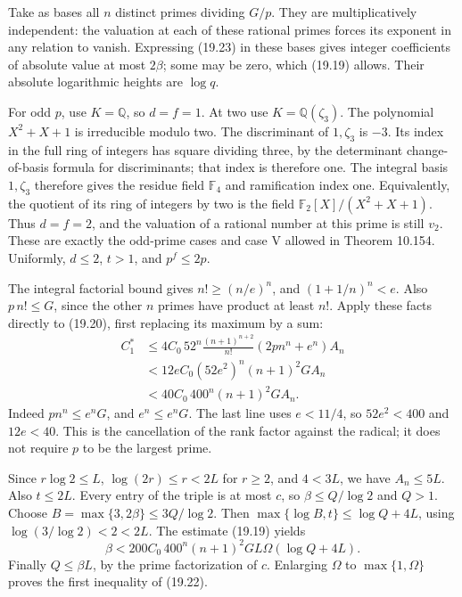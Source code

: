 \documentclass[
  11pt,
  a4paper,
]{article}
\begin{document}
Take as bases all \(n\) distinct primes dividing \(G/p\). They are
multiplicatively independent: the valuation at each of these rational
primes forces its exponent in any relation to vanish. Expressing (19.23)
in these bases gives integer coefficients of absolute value at most
\(2\beta\); some may be zero, which (19.19) allows. Their absolute
logarithmic heights are \(\log q\).

For odd \(p\), use \(K=\mathbb Q\), so \(d=f=1\). At two use
\(K=\mathbb Q(\zeta_3)\). The polynomial \(X^2+X+1\) is irreducible
modulo two. The discriminant of \(1,\zeta_3\) is \(-3\). Its index in
the full ring of integers has square dividing three, by the determinant
change-of-basis formula for discriminants; that index is therefore one.
The integral basis \(1,\zeta_3\) therefore gives the residue field
\(\mathbb F_4\) and ramification index one. Equivalently, the quotient
of its ring of integers by two is the field
\(\mathbb F_2[X]/(X^2+X+1)\). Thus \(d=f=2\), and the valuation of a
rational number at this prime is still \(v_2\). These are exactly the
odd-prime cases and case V allowed in Theorem 10.154. Uniformly,
\(d\le2\), \(t>1\), and \(p^f\le2p\).

The integral factorial bound gives \(n!\ge(n/e)^n\), and
\((1+1/n)^n<e\). Also \(p\,n!\le G\), since the other \(n\) primes have
product at least \(n!\). Apply these facts directly to (19.20), first
replacing its maximum by a sum: \[
 \begin{aligned}
 C_1^*
 &\le4C_0\,52^n\frac{(n+1)^{n+2}}{n!}
                    (2pn^n+e^n)A_n\\
 &<12eC_0(52e^2)^n(n+1)^2GA_n\\
 &<40C_0\,400^n(n+1)^2GA_n.
 \end{aligned}
 \tag{19.24}
\] Indeed \(pn^n\le e^nG\), and \(e^n\le e^nG\). The last line uses
\(e<11/4\), so \(52e^2<400\) and \(12e<40\). This is the cancellation of
the rank factor against the radical; it does not require \(p\) to be the
largest prime.

Since \(r\log2\le L\), \(\log(2r)\le r<2L\) for \(r\ge2\), and \(4<3L\),
we have \(A_n\le5L\). Also \(t\le2L\). Every entry of the triple is at
most \(c\), so \(\beta\le Q/\log2\) and \(Q>1\). Choose
\(B=\max\{3,2\beta\}\le3Q/\log2\). Then
\(\max\{\log B,t\}\le\log Q+4L\), using \(\log(3/\log2)<2<2L\). The
estimate (19.19) yields \[
 \beta<200C_0\,400^n(n+1)^2GL\Omega(\log Q+4L).
\] Finally \(Q\le\beta L\), by the prime factorization of \(c\).
Enlarging \(\Omega\) to \(\max\{1,\Omega\}\) proves the first inequality
of (19.22).
\end{document}
